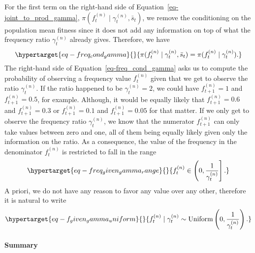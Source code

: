 \documentclass[
]{scrartcl}
\let\oldparagraph\paragraph
\renewcommand{\paragraph}[1]{\oldparagraph{#1}\mbox{}}
\begin{document}
\begin{refsegment}
For the first term on the right-hand side of
Equation~\ref{eq-joint_to_prod_gamma},
\(\pi(f_t^{(n)} \mid \gamma_{t}^{(n)}, \bar{s}_t)\), we remove the
conditioning on the population mean fitness since it does not add any
information on top of what the frequency ratio \(\gamma_t^{(n)}\)
already gives. Therefore, we have
\begin{equation}\protect\hypertarget{eq-freq_cond_gamma}{}{
\pi(f_t^{(n)} \mid \gamma_{t}^{(n)}, \bar{s}_t) =
\pi(f_t^{(n)} \mid \gamma_{t}^{(n)}).
}\label{eq-freq_cond_gamma}\end{equation} The right-hand side of
Equation~\ref{eq-freq_cond_gamma} asks us to compute the probability of
observing a frequency value \(f_t^{(n)}\) given that we get to observe
the ratio \(\gamma_{t}^{(n)}\). If the ratio happened to be
\(\gamma_{t}^{(n)} = 2\), we could have \(f_{t+1}^{(n)} = 1\) and
\(f_{t+1}^{(n)} = 0.5\), for example. Although, it would be equally
likely that \(f_{t+1}^{(n)} = 0.6\) and \(f_{t+1}^{(n)} = 0.3\) or
\(f_{t+1}^{(n)} = 0.1\) and \(f_{t+1}^{(n)} = 0.05\) for that matter. If
we only get to observe the frequency ratio \(\gamma_t^{(n)}\), we know
that the numerator \(f_{t+1}^{(n)}\) can only take values between zero
and one, all of them being equally likely given only the information on
the ratio. As a consequence, the value of the frequency in the
denominator \(f_{t}^{(n)}\) is restricted to fall in the range
\begin{equation}\protect\hypertarget{eq-freq_given_gamma_range}{}{
f_{t}^{(n)} \in \left(0, \frac{1}{\gamma_t^{(n)}} \right].
}\label{eq-freq_given_gamma_range}\end{equation} A priori, we do not
have any reason to favor any value over any other, therefore it is
natural to write
\begin{equation}\protect\hypertarget{eq-f_given_gamma_uniform}{}{
f_t^{(n)} \mid \gamma_t^{(n)} \sim 
\operatorname{Uniform}\left( 0, \frac{1}{\gamma_t^{(n)}} \right).
}\label{eq-f_given_gamma_uniform}\end{equation}

\hypertarget{summary-1}{%
\paragraph{Summary}\label{summary-1}}


\end{refsegment}
\end{document}
